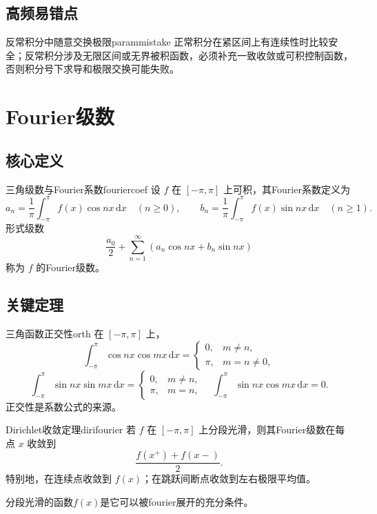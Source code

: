 \documentclass[UTF8,zihao=-4,openany]{ctexbook}
\newcommand{\dd}{\,\mathrm{d}}
\begin{document}
\section{高频易错点}
\begin{mistake}{反常积分中随意交换极限}{parammistake}
正常积分在紧区间上有连续性时比较安全；反常积分涉及无限区间或无界被积函数，必须补充一致收敛或可积控制函数，否则积分号下求导和极限交换可能失败。
\end{mistake}

\chapter{Fourier级数}
\section{核心定义}
\begin{definition}{三角级数与Fourier系数}{fouriercoef}
设 $f$ 在 $[-\pi,\pi]$ 上可积，其Fourier系数定义为
\[
a_n=\frac1\pi\int_{-\pi}^{\pi}f(x)\cos nx\dd x\quad(n\ge0),\qquad
b_n=\frac1\pi\int_{-\pi}^{\pi}f(x)\sin nx\dd x\quad(n\ge1).
\]
形式级数
\[
\frac{a_0}{2}+\sum_{n=1}^{\infty}(a_n\cos nx+b_n\sin nx)
\]
称为 $f$ 的Fourier级数。
\end{definition}

\section{关键定理}
\begin{theorem}{三角函数正交性}{orth}
在 $[-\pi,\pi]$ 上，
\[
\int_{-\pi}^{\pi}\cos nx\cos mx\dd x=\begin{cases}0,&m\ne n,\\\pi,&m=n\ne0,\end{cases}
\]
\[
\int_{-\pi}^{\pi}\sin nx\sin mx\dd x=\begin{cases}0,&m\ne n,\\\pi,&m=n,\end{cases}
\quad
\int_{-\pi}^{\pi}\sin nx\cos mx\dd x=0.
\]
正交性是系数公式的来源。
\end{theorem}

\begin{theorem}{Dirichlet收敛定理}{dirifourier}
若 $f$ 在 $[-\pi,\pi]$ 上分段光滑，则其Fourier级数在每点 $x$ 收敛到
\[
\frac{f(x^{+})+f(x{-})}{2}.
\]
特别地，在连续点收敛到 $f(x)$；在跳跃间断点收敛到左右极限平均值。
\end{theorem}分段光滑的函数\(f(x)\)是它可以被fourier展开的充分条件。
\end{document}
